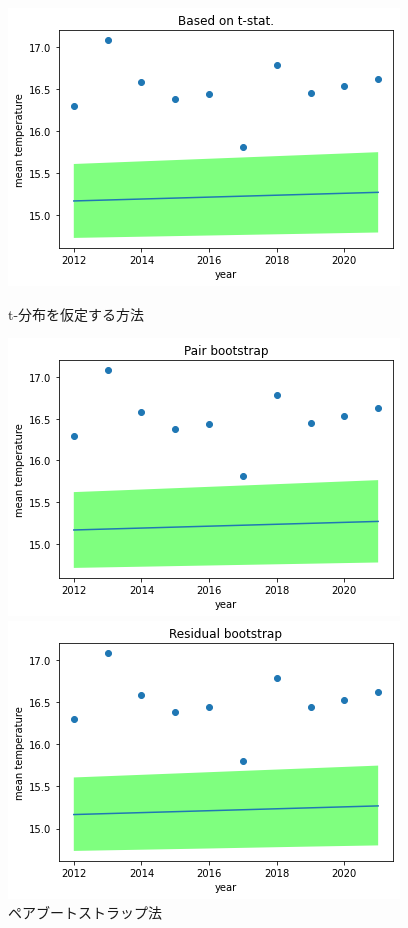 \documentclass[a4paper,11pt]{jsarticle}
\begin{document}
\begin{figure}[htbp]
  \begin{minipage}[b]{0.32\linewidth}
    \centering
    \includegraphics[width=\linewidth]{tstat.png}
    \caption{t-分布を仮定する方法}
  \end{minipage}
  \begin{minipage}[b]{0.32\linewidth}
    \centering
    \includegraphics[width=\linewidth]{pair_bootstrap.png}
    \caption{ペアブートストラップ法}
  \end{minipage}
  \begin{minipage}[b]{0.32\linewidth}
    \centering
    \includegraphics[width=\linewidth]{residual_bootstrap.png}

\end{minipage}
\end{figure}
\end{document}
